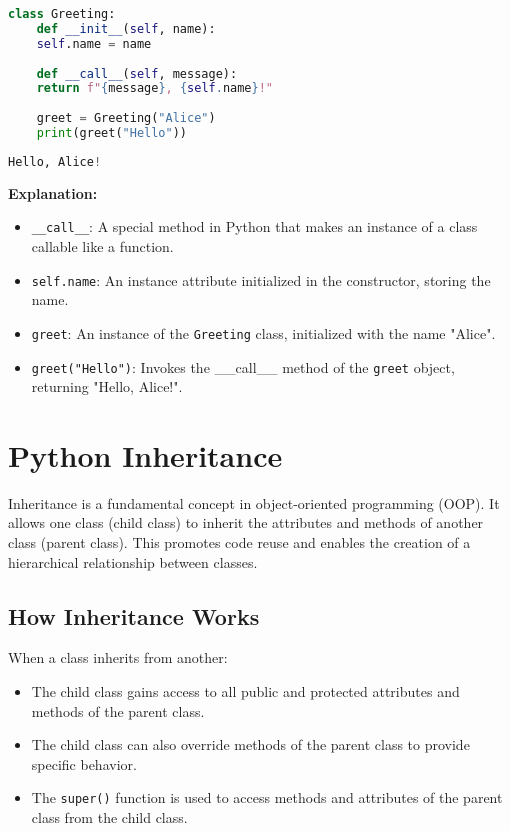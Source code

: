 \begin{lstlisting}[language=python, caption={\_\_call\_\_ Method}]
	class Greeting:
	def __init__(self, name):
	self.name = name
	
	def __call__(self, message):
	return f"{message}, {self.name}!"
	
	greet = Greeting("Alice")
	print(greet("Hello"))
\end{lstlisting}

\begin{lstlisting}[language=python, caption={Output \_\_call\_\_ method}]
	Hello, Alice!
\end{lstlisting}

\textbf{Explanation:}
\begin{itemize}
	\item \texttt{\_\_call\_\_}: A special method in Python that makes an instance of a class callable like a function.
	\item \texttt{self.name}: An instance attribute initialized in the constructor, storing the name.
	\item \texttt{greet}: An instance of the \texttt{Greeting} class, initialized with the name "Alice".
	\item \texttt{greet("Hello")}: Invokes the \_\_call\_\_ method of the \texttt{greet} object, returning "Hello, Alice!".
\end{itemize}

\section{Python Inheritance}
Inheritance is a fundamental concept in object-oriented programming (OOP). It allows one class (child class) to inherit the attributes and methods of another class (parent class). This promotes code reuse and enables the creation of a hierarchical relationship between classes.

\subsection{How Inheritance Works}
When a class inherits from another:
\begin{itemize}
	\item The child class gains access to all public and protected attributes and methods of the parent class.
	\item The child class can also override methods of the parent class to provide specific behavior.
	\item The \texttt{super()} function is used to access methods and attributes of the parent class from the child class.
\end{itemize}

